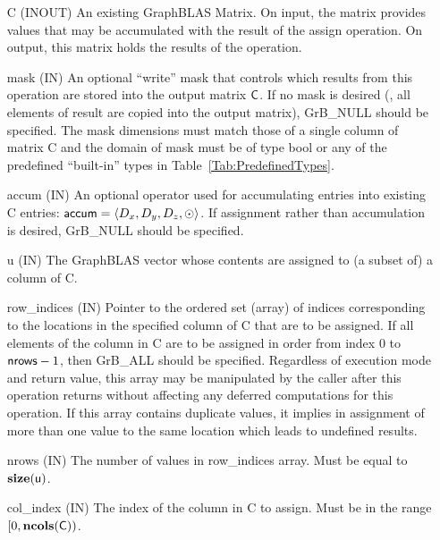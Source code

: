 \begin{itemize}[leftmargin=1.1in]
    \item[{\sf C}]    ({\sf INOUT}) An existing GraphBLAS Matrix.  On input,
    the matrix provides values that may be accumulated with the result of the
    assign operation.  On output, this matrix holds the results of the
    operation.

    \item[{\sf mask}]  ({\sf IN}) An optional ``write'' mask that controls which
    results from this operation are stored into the output matrix
    ${\sf C}$.  If no mask is desired (\ie, all elements
    of result are copied into the output matrix), {\sf GrB\_NULL}
    should be specified. The mask dimensions must match those of a single column
    of matrix {\sf C} and the domain of {\sf mask} must be
    of type {\sf bool} or any of the predefined ``built-in'' types in
    Table~\ref{Tab:PredefinedTypes}.
    
    \item[{\sf accum}]    ({\sf IN}) An optional operator used for accumulating
    entries into existing {\sf C} entries: ${\sf accum} = \langle D_x,
    D_y, D_z,\odot \rangle$. If assignment rather than accumulation is
    desired, {\sf GrB\_NULL} should be specified.

    \item[{\sf u}]       ({\sf IN}) The GraphBLAS vector whose contents are 
    assigned to (a subset of) a column of {\sf C}.

    \item[{\sf row\_indices}]  ({\sf IN}) Pointer to the ordered set (array) of 
    indices corresponding to the locations in the specified column of {\sf C} 
    that are to be assigned.  If all elements of the column in {\sf C} are to be 
    assigned in order from index $0$ to ${\sf nrows} - 1$, then {\sf GrB\_ALL} should be 
    specified.  Regardless of execution mode and return value, this array may be
    manipulated by the caller after this operation returns without affecting any 
    deferred computations for this operation.
    If this array contains duplicate values, it implies in assignment of more 
    than one value to the same location which leads to undefined results.
    
    \item[{\sf nrows}] ({\sf IN}) The number of values in {\sf row\_indices} array.
    Must be equal to $\bold{size}({\sf u})$.
    
    \item[{\sf col\_index}]  ({\sf IN}) The index of the column in {\sf C} to 
    assign. Must be in the range $[0, \bold{ncols}({\sf C}))$.


\end{itemize}
